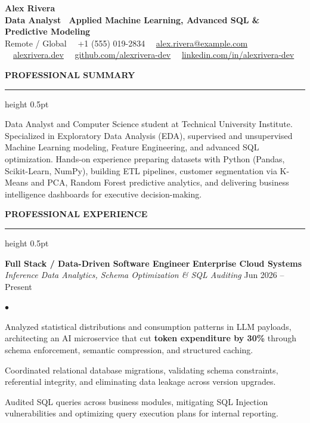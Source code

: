 \documentclass[10pt,letterpaper]{article}
\newcommand{\resumesection}[1]{%
  \vspace{2pt}%
  {\color{primary}\normalsize\bfseries\MakeUppercase{#1}}%
  \vspace{1pt}\hrule height 0.5pt\vspace{2pt}%
}
\renewenvironment{itemize}{%
  \begin{list}{\color{primary}$\bullet$}{%
    \setlength{\leftmargin}{1.1em}%
    \setlength{\itemsep}{0.5pt}%
    \setlength{\topsep}{1pt}%
    \setlength{\parsep}{0pt}%
    \setlength{\partopsep}{0pt}%
  }%
}{%
  \end{list}%
}
\begin{document}
\color{textdark}

\begin{center}
    {\LARGE \textbf{\color{primary} Alex Rivera}} \\ \vspace{1.5pt}
    {\large \textbf{Data Analyst \textbar\ Applied Machine Learning, Advanced SQL \& Predictive Modeling}} \\ \vspace{2pt}
    {\small
        Remote / Global \ \textbullet \
        +1 (555) 019-2834 \ \textbullet \
        \href{mailto:alex.rivera@example.com}{alex.rivera@example.com} \ \textbullet \
        \href{https://alexrivera.dev}{alexrivera.dev} \ \textbullet \
        \href{https://github.com/alexrivera-dev}{github.com/alexrivera-dev} \ \textbullet \
        \href{https://linkedin.com/in/alexrivera-dev}{linkedin.com/in/alexrivera-dev}
    }
\end{center}

\vspace{-6pt}

\resumesection{Professional Summary}
{\small Data Analyst and Computer Science student at Technical University Institute. Specialized in Exploratory Data Analysis (EDA), supervised and unsupervised Machine Learning modeling, Feature Engineering, and advanced SQL optimization. Hands-on experience preparing datasets with Python (Pandas, Scikit-Learn, NumPy), building ETL pipelines, customer segmentation via K-Means and PCA, Random Forest predictive analytics, and delivering business intelligence dashboards for executive decision-making.}

\resumesection{Professional Experience}

\textbf{Full Stack / Data-Driven Software Engineer} \hfill \textbf{Enterprise Cloud Systems} \\
\textit{Inference Data Analytics, Schema Optimization \& SQL Auditing} \hfill Jun 2026 -- Present
\begin{itemize}
    \item Analyzed statistical distributions and consumption patterns in LLM payloads, architecting an AI microservice that cut \textbf{token expenditure by 30\%} through schema enforcement, semantic compression, and structured caching.
    \item Coordinated relational database migrations, validating schema constraints, referential integrity, and eliminating data leakage across version upgrades.
    \item Audited SQL queries across business modules, mitigating SQL Injection vulnerabilities and optimizing query execution plans for internal reporting.
\end{itemize}
\end{document}
